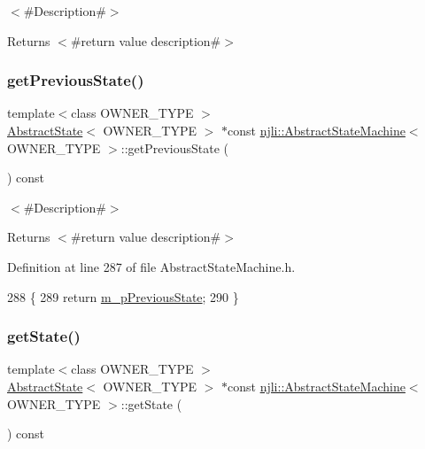 $<$\#\+Description\#$>$

\begin{DoxyReturn}{Returns}
$<$\#return value description\#$>$ 
\end{DoxyReturn}
\mbox{\label{classnjli_1_1_abstract_state_machine_a8e946baa055b5dcde6a9916ef10e5c37}} 
\subsubsection{\texorpdfstring{get\+Previous\+State()}{getPreviousState()}}
{\footnotesize\ttfamily template$<$class O\+W\+N\+E\+R\+\_\+\+T\+Y\+PE $>$ \\
\mbox{\hyperlink{classnjli_1_1_abstract_state}{Abstract\+State}}$<$ O\+W\+N\+E\+R\+\_\+\+T\+Y\+PE $>$ $\ast$const \mbox{\hyperlink{classnjli_1_1_abstract_state_machine}{njli\+::\+Abstract\+State\+Machine}}$<$ O\+W\+N\+E\+R\+\_\+\+T\+Y\+PE $>$\+::get\+Previous\+State (\begin{DoxyParamCaption}{ }\end{DoxyParamCaption}) const}

$<$\#\+Description\#$>$

\begin{DoxyReturn}{Returns}
$<$\#return value description\#$>$ 
\end{DoxyReturn}


Definition at line 287 of file Abstract\+State\+Machine.\+h.


\begin{DoxyCode}
288   \{
289     \textcolor{keywordflow}{return} \mbox{\hyperlink{classnjli_1_1_abstract_state_machine_a43a2c2c7a36aba24176e5d6d82ab9f45}{m\_pPreviousState}};
290   \}
\end{DoxyCode}
\mbox{\label{classnjli_1_1_abstract_state_machine_a026a33bc918f423304b442e0dfaa046e}} 
\subsubsection{\texorpdfstring{get\+State()}{getState()}}
{\footnotesize\ttfamily template$<$class O\+W\+N\+E\+R\+\_\+\+T\+Y\+PE $>$ \\
\mbox{\hyperlink{classnjli_1_1_abstract_state}{Abstract\+State}}$<$ O\+W\+N\+E\+R\+\_\+\+T\+Y\+PE $>$ $\ast$const \mbox{\hyperlink{classnjli_1_1_abstract_state_machine}{njli\+::\+Abstract\+State\+Machine}}$<$ O\+W\+N\+E\+R\+\_\+\+T\+Y\+PE $>$\+::get\+State (\begin{DoxyParamCaption}{ }\end{DoxyParamCaption}) const}

